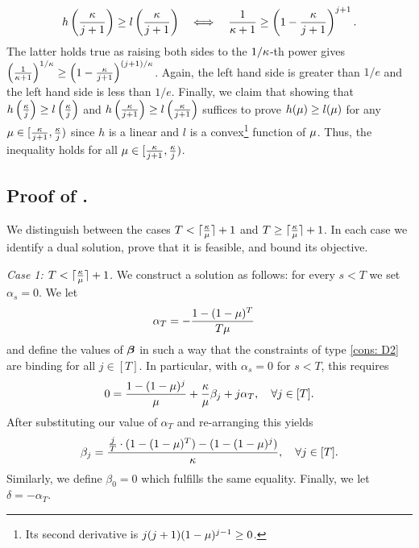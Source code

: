 \begin{align*}
    h\left( \frac{\kappa}{j+1} \right) \geq l\left( \frac{\kappa}{j+1} \right) \quad \Longleftrightarrow \quad \frac{1}{\kappa +1} \geq \left( 1 - \frac{\kappa}{j+1} \right)^{j+1}.
\end{align*}
The latter holds true as raising both sides to the $1/\kappa$-th power gives $\left(\frac{1}{\kappa +1}\right)^{1/\kappa} \geq \left(1-\frac{\kappa}{j+1}\right)^{(j+1)/\kappa}$. Again, the left hand side is greater than $1/e$ and the left hand side is less than $1/e$. Finally, we claim that showing that $h\left( \frac{\kappa}{j} \right) \geq l\left( \frac{\kappa}{j} \right)$ and $h\left( \frac{\kappa}{j+1} \right) \geq l\left( \frac{\kappa}{j+1} \right)$  suffices to prove $h(\mu) \geq l(\mu)$ for any $\mu \in [\frac{\kappa}{j+1}, \frac{\kappa}{j})$ since $h$ is a linear  and $l$ is a convex\footnote{Its second derivative is $j(j+1)(1-\mu)^{j-1} \geq 0$.} function of $\mu$. Thus,  the  inequality holds for all $\mu \in [\frac{\kappa}{j+1}, \frac{\kappa}{j})$. 
\hfill\Halmos %



\subsection{Proof of .}
\label{proof: AdvCR}
We distinguish between the cases $T < \lceil \frac{\kappa}{\mu} \rceil + 1$ and $T \geq \lceil \frac{\kappa}{\mu} \rceil + 1$. In each case we identify a dual solution, prove that it is feasible, and bound its objective.


\emph{Case 1: $T < \lceil \frac{\kappa}{\mu} \rceil + 1$. } We construct a solution as follows: for every $s < T$ we set $\alpha_s = 0$. We let
    \begin{align*}
        \alpha_T &= - \frac{1-(1-\mu)^T}{T\mu}
    \end{align*}
    and define the values of $\bm{\beta}$ in such a way that the constraints of type \ref{cons: D2} are binding for all $j \in [T]$. In particular, with $\alpha_s=0$ for $s<T$, this requires \begin{equation*}
        0 = \frac{1- (1-\mu)^j}{\mu} + \frac{\kappa}{\mu} \beta_j + j \alpha_T, \quad \forall j \in [T].
    \end{equation*}
    After substituting our value of $\alpha_T$ and re-arranging this yields
    \begin{equation*}
        \beta_j =  \frac{\frac{j}{T} \cdot (1-(1-\mu)^T)-(1-(1-\mu)^j)}{\kappa}, \quad \forall j \in [T].
    \end{equation*}
    Similarly, we define $\beta_0=0$ which fulfills the same equality. Finally, we let $\delta = -\alpha_T$.

